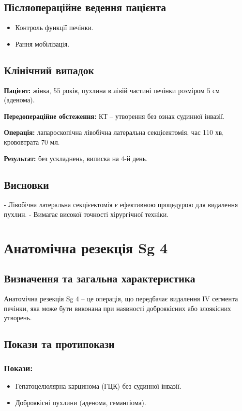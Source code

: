 \begin{refsection}
\subsection{Післяопераційне ведення пацієнта}
\begin{itemize}
    \item Контроль функції печінки.
    \item Рання мобілізація.
\end{itemize}

\subsection{Клінічний випадок}
\textbf{Пацієнт:} жінка, 55 років, пухлина в лівій частині печінки розміром 5 см (аденома).

\textbf{Передопераційне обстеження:} КТ – утворення без ознак судинної інвазії.

\textbf{Операція:} лапароскопічна лівобічна латеральна секцієектомія, час 110 хв, крововтрата 70 мл.

\textbf{Результат:} без ускладнень, виписка на 4-й день.

\subsection{Висновки}
- Лівобічна латеральна секцієектомія є ефективною процедурою для видалення пухлин.
- Вимагає високої точності хірургічної техніки.

\section{Анатомічна резекція Sg 4}
\subsection{Визначення та загальна характеристика}
Анатомічна резекція Sg 4 – це операція, що передбачає видалення IV сегмента печінки, яка може бути виконана при наявності доброякісних або злоякісних утворень.

\subsection{Покази та протипокази}
\subsubsection{Покази:}
\begin{itemize}
    \item Гепатоцелюлярна карцинома (ГЦК) без судинної інвазії.
    \item Доброякісні пухлини (аденома, гемангіома).
\end{itemize}


\end{refsection}
